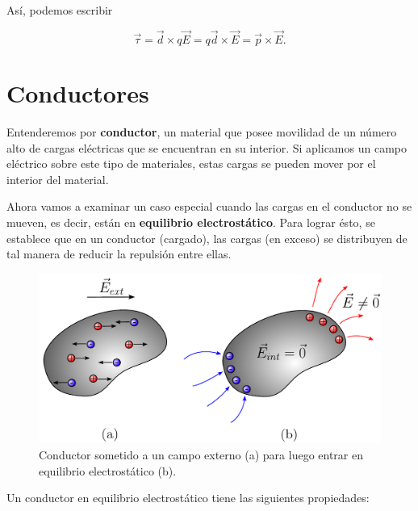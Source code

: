 Así, podemos escribir
\begin{shaded}
    $$\vec{\tau} = \vec{d} \times q \vec{E} = q\vec{d} \times \vec{E} = \vec{p} \times \vec{E}.$$
\end{shaded}

\section{Conductores}

Entenderemos por \textbf{conductor}, un material que posee movilidad de un número alto de cargas eléctricas que se encuentran en su interior. Si aplicamos un campo eléctrico sobre este tipo de materiales, estas cargas se pueden mover por el interior del material.

Ahora vamos a examinar un caso especial cuando las cargas en el conductor no se mueven, es decir, están en \textbf{equilibrio electrostático}. Para lograr ésto, se establece que en un conductor (cargado), las cargas (en exceso) se distribuyen de tal manera de reducir la repulsión entre ellas.

\begin{figure}[H]
    \centering
    \includegraphics[scale = 0.6]{Figuras/Conductor.pdf}
    \caption{Conductor sometido a un campo externo (a) para luego entrar en equilibrio electrostático (b).}
    \label{fig:Conductor}
\end{figure}

Un conductor en equilibrio electrostático tiene las siguientes propiedades:

